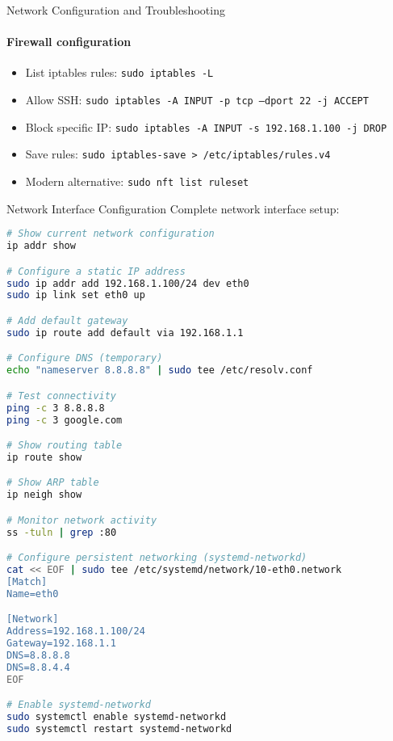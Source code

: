\begin{KR}{Network Configuration and Troubleshooting}
    \paragraph{Firewall configuration}
    \begin{itemize}
        \item List iptables rules: \texttt{sudo iptables -L}
        \item Allow SSH: \texttt{sudo iptables -A INPUT -p tcp --dport 22 -j ACCEPT}
        \item Block specific IP: \texttt{sudo iptables -A INPUT -s 192.168.1.100 -j DROP}
        \item Save rules: \texttt{sudo iptables-save > /etc/iptables/rules.v4}
        \item Modern alternative: \texttt{sudo nft list ruleset}
    \end{itemize}
\end{KR}

\begin{example2}{Network Interface Configuration}
    Complete network interface setup:
    
\begin{lstlisting}[language=bash, style=basesmol]
# Show current network configuration
ip addr show

# Configure a static IP address
sudo ip addr add 192.168.1.100/24 dev eth0
sudo ip link set eth0 up

# Add default gateway
sudo ip route add default via 192.168.1.1

# Configure DNS (temporary)
echo "nameserver 8.8.8.8" | sudo tee /etc/resolv.conf

# Test connectivity
ping -c 3 8.8.8.8
ping -c 3 google.com

# Show routing table
ip route show

# Show ARP table
ip neigh show

# Monitor network activity
ss -tuln | grep :80

# Configure persistent networking (systemd-networkd)
cat << EOF | sudo tee /etc/systemd/network/10-eth0.network
[Match]
Name=eth0

[Network]
Address=192.168.1.100/24
Gateway=192.168.1.1
DNS=8.8.8.8
DNS=8.8.4.4
EOF

# Enable systemd-networkd
sudo systemctl enable systemd-networkd
sudo systemctl restart systemd-networkd
\end{lstlisting}
\end{example2}

